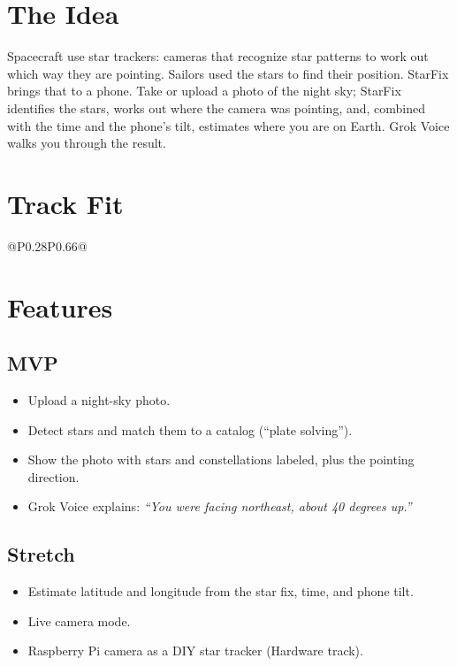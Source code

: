 \documentclass[11pt]{article}
\begin{document}

\section{The Idea}
Spacecraft use star trackers: cameras that recognize star patterns to work out
which way they are pointing. Sailors used the stars to find their position. StarFix
brings that to a phone. Take or upload a photo of the night sky; StarFix identifies
the stars, works out where the camera was pointing, and, combined with the time
and the phone's tilt, estimates where you are on Earth. Grok Voice walks you
through the result.

\section{Track Fit}
\begin{tabular}{@{}P{0.28\textwidth}P{0.66\textwidth}@{}}
\toprule
{}
\bottomrule
\end{tabular}

\section{Features}
\subsection{MVP}
\begin{itemize}
  \item Upload a night-sky photo.
  \item Detect stars and match them to a catalog (``plate solving'').
  \item Show the photo with stars and constellations labeled, plus the pointing direction.
  \item Grok Voice explains: \emph{``You were facing northeast, about 40 degrees up.''}
\end{itemize}
\subsection{Stretch}
\begin{itemize}
  \item Estimate latitude and longitude from the star fix, time, and phone tilt.
  \item Live camera mode.
  \item Raspberry Pi camera as a DIY star tracker (Hardware track).
\end{itemize}
\end{document}

